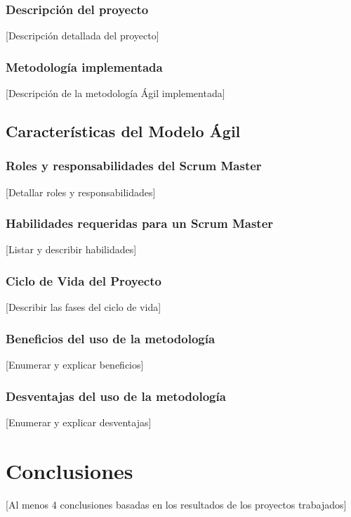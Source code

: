 \documentclass[12pt,a4paper]{article}
\begin{document}
\subsubsection{Descripción del proyecto}
[Descripción detallada del proyecto]

\subsubsection{Metodología implementada}
[Descripción de la metodología Ágil implementada]

\subsection{Características del Modelo Ágil}
\subsubsection{Roles y responsabilidades del Scrum Master}
[Detallar roles y responsabilidades]

\subsubsection{Habilidades requeridas para un Scrum Master}
[Listar y describir habilidades]

\subsubsection{Ciclo de Vida del Proyecto}
[Describir las fases del ciclo de vida]

\subsubsection{Beneficios del uso de la metodología}
[Enumerar y explicar beneficios]

\subsubsection{Desventajas del uso de la metodología}
[Enumerar y explicar desventajas]

\section{Conclusiones}
[Al menos 4 conclusiones basadas en los resultados de los proyectos trabajados]

\end{document}
